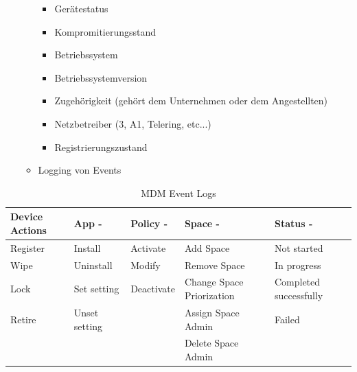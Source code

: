 \begin{itemize}
\begin{itemize}
		\begin{itemize}
			\item Gerätestatus
			\item Kompromitierungsstand
			\item Betriebssystem
			\item Betriebssystemversion
			\item Zugehörigkeit (gehört dem Unternehmen oder dem Angestellten)
			\item Netzbetreiber (3, A1, Telering, etc...)
			\item Registrierungszustand 
		\end{itemize}
		\item Logging von Events
	\end{itemize}
\end{itemize}	

\begin{table}[h]
\centering
\begin{tabular}{|l|l|l|l|l|}
\hline
\textbf{Device Actions} & \textbf{App -} & \textbf{Policy -} & \textbf{Space -}          & \textbf{Status -}      \\ \hline
Register                & Install        & Activate          & Add Space                 & Not started            \\ \hline
Wipe                    & Uninstall      & Modify            & Remove Space              & In progress            \\ \hline
Lock                    & Set setting    & Deactivate        & Change Space Priorization & Completed successfully \\ \hline
Retire                  & Unset setting  &                   & Assign Space Admin        & Failed                 \\ \hline
                        &                &                   & Delete Space Admin        &                        \\ \hline
\end{tabular}
\caption{MDM Event Logs}
\end{table}

